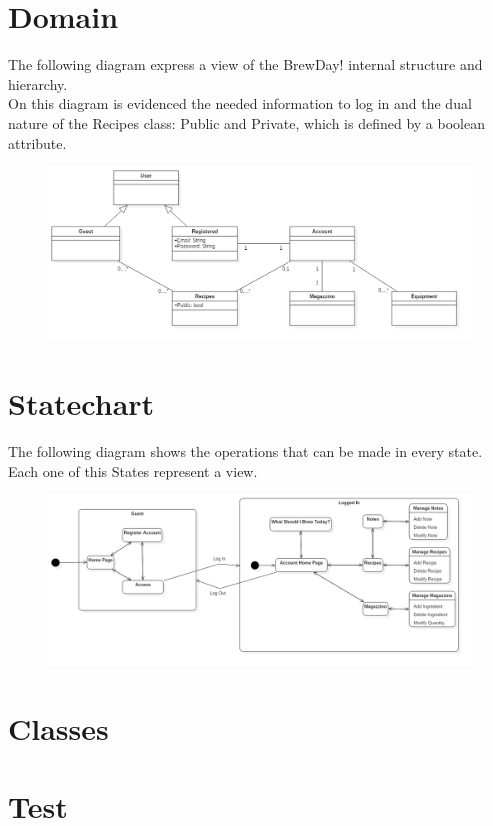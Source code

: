 \documentclass[12pt]{article}
\begin{document}
\section{Domain}
The following diagram express a view of the BrewDay! internal structure and hierarchy.\\
On this diagram is evidenced the needed information to log in and the dual nature of the Recipes class: Public and Private, which is defined by a boolean attribute.
\begin{figure}[H]
\includegraphics[width=1.25\textwidth, left]{DomainDiagram.jpg}
\end{figure}

\pagebreak
\section{Statechart}
The following diagram shows the operations that can be made in every state.\\
Each one of this States represent a view.
\begin{figure}[H]
\includegraphics[scale=0.4]{Statechart.png}
\end{figure}
\section{Classes}
\section{Test}
\end{document}
